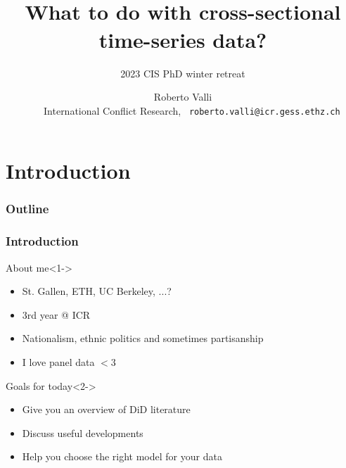 \documentclass[12pt,aspectratio=169]{beamer}\usepackage[]{graphicx}\usepackage[]{xcolor}
\title{~\\[0.5em] What to do with cross-sectional time-series data?}
\subtitle{2023 CIS PhD winter retreat}
\date{}
\author{\large \alert{Roberto Valli} \\ \small ~$\quad$  International Conflict Research, \ \texttt{roberto.valli@icr.gess.ethz.ch}}
\begin{document}
	
    \maketitle



\section{Introduction}




\begin{frame}
\frametitle{Outline}

    \tableofcontents
    
\end{frame}


\begin{frame}
\frametitle{Introduction}

    \begin{alertblock}{About me}<1->
    \small
    
    \begin{itemize}[itemsep=0em, topsep=0pt]
        \item St. Gallen, ETH, UC Berkeley, ...?
        \item 3rd year @ ICR
        \item Nationalism, ethnic politics and sometimes partisanship
        \item I love panel data $<3$
    \end{itemize}

    \end{alertblock}

    \begin{alertblock}{Goals for today}<2->
    \small

    \begin{itemize}[itemsep=0em, topsep=0pt]
        \item Give you an overview of DiD literature
        \item Discuss useful developments
        \item Help you choose the right model for your data
    \end{itemize}

    \end{alertblock}
%     
\end{frame}

\end{document}

